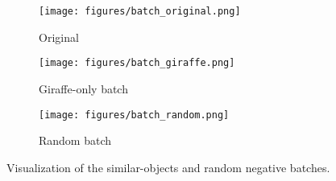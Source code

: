 \begin{figure}[h]
\centering\small
\begin{subfigure}{0.24\textwidth}
\texttt{[image: figures/batch\_original.png]}
\caption{Original}
\end{subfigure}
\begin{subfigure}{0.24\textwidth}
\texttt{[image: figures/batch\_giraffe.png]}
\caption{Giraffe-only batch}
\end{subfigure}
\begin{subfigure}{0.24\textwidth}
\texttt{[image: figures/batch\_random.png]}
\caption{Random batch}
\end{subfigure}
\caption{
Visualization of the similar-objects and random negative batches.
}\label{fig:batch-giraffe}
\end{figure}
